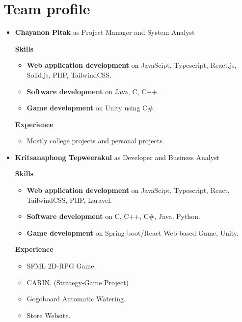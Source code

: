 \documentclass[a4paper, 12pt]{report}
\begin{document}
    \section*{Team profile}
        \begin{itemize}
            \item \textbf{Chayanon Pitak} as Project Manager and System Analyst
            
                \textbf{Skills}
                \begin{itemize}
                    \item \textbf{Web application development} on JavaScipt, Typescript, React.js, Solid.js, PHP, TailwindCSS.
                    \item \textbf{Software development} on Java, C, C++.
                    \item \textbf{Game development} on Unity using C\#.
                \end{itemize}

                \textbf{Experience}
                \begin{itemize}
                    \item Mostly college projects and personal projects.
                \end{itemize}
            \item \textbf{Kritsanaphong Tepweerakul} as Developer and Business Analyst
                
                \textbf{Skills}
                \begin{itemize}
                    \item \textbf{Web application development} on JavaScipt, Typescript, React, TailwindCSS, PHP, Laravel.
                    \item \textbf{Software development} on C, C++, C\#, Java, Python.
                    \item \textbf{Game development} on Spring boot/React Web-based Game, Unity.
                \end{itemize}
                
                \textbf{Experience}
                \begin{itemize}
                    \item SFML 2D-RPG Game.
                    \item CARIN. (Strategy-Game Project)
                    \item Gogoboard Automatic Watering.
                    \item Store Website.
                \end{itemize}


\end{itemize}
\end{document}
